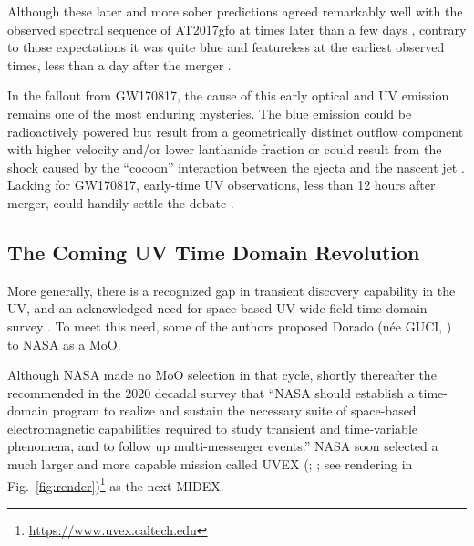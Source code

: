 \documentclass[twocolumn,times]{aastex631}
\begin{document}
Although these later and more sober predictions agreed remarkably well with the observed spectral sequence of AT2017gfo at times later than a few days \citep{2017Natur.551...67P,2017Natur.551...80K,2017ApJ...851L..21V}, contrary to those expectations it was quite blue and featureless at the earliest observed times, less than a day after the merger \citep{2017Sci...358.1574S}.

In the fallout from GW170817, the cause of this early optical and \ac{UV} emission remains one of the most enduring mysteries. The blue emission could be radioactively powered but result from a geometrically distinct outflow component with higher velocity and/or lower lanthanide fraction \citep{2017ApJ...848L..18N} or could result from the shock caused by the ``cocoon'' interaction between the ejecta and the nascent jet \citep{2017Sci...358.1559K,2018MNRAS.479..588G}. Lacking for GW170817, early-time \ac{UV} observations, less than 12 hours after merger, could handily settle the debate \citep{2018ApJ...855L..23A}.

\subsection{The Coming UV Time Domain Revolution}

More generally, there is a recognized gap in transient discovery capability in the \ac{UV}, and an acknowledged need for space-based \ac{UV} wide-field time-domain survey \citep{2014AJ....147...79S}. To meet this need, some of the authors proposed Dorado (n\'{e}e GUCI, \citealt{2019AAS...23421203C,2023ApJ...944..126D}) to NASA as a \ac{MoO}.

Although NASA made no \ac{MoO} selection in that cycle, shortly thereafter the \citet{2021pdaa.book.....N} recommended in the 2020 decadal survey that ``NASA should establish a time-domain program to realize and sustain the necessary suite of space-based electromagnetic capabilities required to study transient and time-variable phenomena, and to follow up multi-messenger events.'' NASA soon selected a much larger and more capable mission called \acl{UVEX} (; \citealt{2021arXiv211115608K}; see rendering in Fig.~\ref{fig:render})\footnote{\url{https://www.uvex.caltech.edu}} as the next \ac{MIDEX}.
\end{document}
